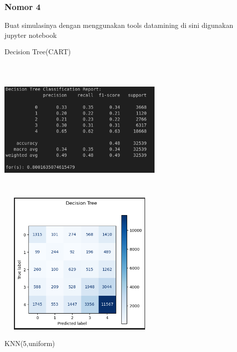 \documentclass{article}
\begin{document}
\subsubsection*{Nomor 4}
Buat simulasinya dengan menggunakan tools datamining
 \bigbreak
 di sini digunakan jupyter notebook
 \\
 \begin{center}
    Decision Tree(CART)   
 \end{center}
  \begin{center}
    \includegraphics[width=8cm, height=7cm]{images/decision-tree-f1.png}
    \includegraphics[width=8cm, height=7cm]{images/Dt-confusion.png}   
 \end{center}
 \begin{center}
    KNN(5,uniform)
 \end{center}
\end{document}
